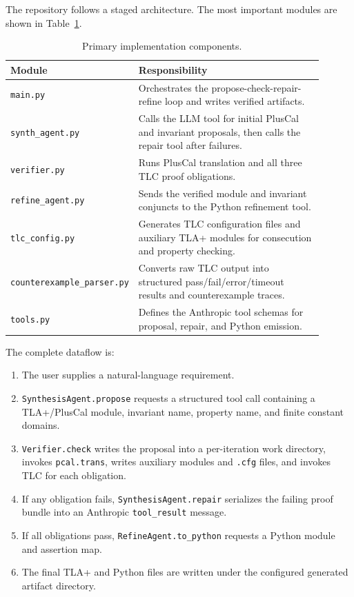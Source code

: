 \documentclass[11pt]{article}
\begin{document}
The repository follows a staged architecture. The most important modules are
shown in Table~\ref{tab:architecture}.

\begin{table}[h]
\centering
\begin{tabular}{p{0.28\linewidth}p{0.62\linewidth}}
\toprule
Module & Responsibility \\
\midrule
\texttt{main.py} & Orchestrates the propose-check-repair-refine loop and
writes verified artifacts. \\
\texttt{synth\_agent.py} & Calls the LLM tool for initial PlusCal
and invariant proposals, then calls the repair tool after failures. \\
\texttt{verifier.py} & Runs PlusCal translation and all three TLC
proof obligations. \\
\texttt{refine\_agent.py} & Sends the verified module and invariant
conjuncts to the Python refinement tool. \\
\texttt{tlc\_config.py} & Generates TLC configuration files and
auxiliary TLA+ modules for consecution and property checking. \\
\texttt{counterexample\_parser.py} & Converts raw TLC output into
structured pass/fail/error/timeout results and counterexample traces. \\
\texttt{tools.py} & Defines the Anthropic tool schemas for proposal,
repair, and Python emission. \\
\bottomrule
\end{tabular}
\caption{Primary implementation components.}
\label{tab:architecture}
\end{table}

The complete dataflow is:

\begin{enumerate}[leftmargin=*]
  \item The user supplies a natural-language requirement.
  \item \texttt{SynthesisAgent.propose} requests a structured tool call
  containing a TLA+/PlusCal module, invariant name, property name, and finite
  constant domains.
  \item \texttt{Verifier.check} writes the proposal into a per-iteration work
  directory, invokes \texttt{pcal.trans}, writes auxiliary modules and
  \texttt{.cfg} files, and invokes TLC for each obligation.
  \item If any obligation fails, \texttt{SynthesisAgent.repair} serializes the
  failing proof bundle into an Anthropic \texttt{tool\_result} message.
  \item If all obligations pass, \texttt{RefineAgent.to\_python} requests a
  Python module and assertion map.
  \item The final TLA+ and Python files are written under the configured
  generated artifact directory.
\end{enumerate}
\end{document}
